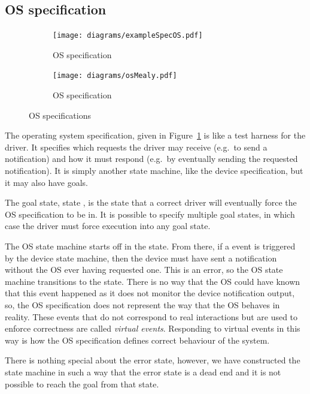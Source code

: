 \subsection{OS specification}

\begin{figure}
\centering
\begin{subfigure}[t]{0.47\textwidth}
\texttt{[image: diagrams/exampleSpecOS.pdf]}
\caption{OS specification}
\label{fig:os_spec}
\end{subfigure}
\hfill
\begin{subfigure}[t]{0.47\textwidth}
\centering
\texttt{[image: diagrams/osMealy.pdf]}
\caption{OS specification}
\label{fig:os_spec_mealy}
\end{subfigure}
\caption{OS specifications}
\end{figure}

The operating system specification, given in Figure~\ref{fig:os_spec} is like a test harness for the driver. It specifies which requests the driver may receive (e.g.\ to send a notification) and how it must respond (e.g.\ by eventually sending the requested notification). It is simply another state machine, like the device specification, but it may also have goals.

The goal state, state , is the state that a correct driver will eventually force the OS specification to be in. It is possible to specify multiple goal states, in which case the driver must force execution into any goal state.

The OS state machine starts off in the  state. From there, if a  event is triggered by the device state machine, then the device must have sent a notification without the OS ever having requested one. This is an error, so the OS state machine transitions to the  state. There is no way that the OS could have known that this event happened as it does not monitor the device notification output, so, the OS specification does not represent the way that the OS behaves in reality. These events that do not correspond to real interactions but are used to enforce correctness are called \emph{virtual events}. Responding to virtual events in this way is how the OS specification defines correct behaviour of the system.

There is nothing special about the error state, however, we have constructed the state machine in such a way that the error state is a dead end and it is not possible to reach the goal from that state.

